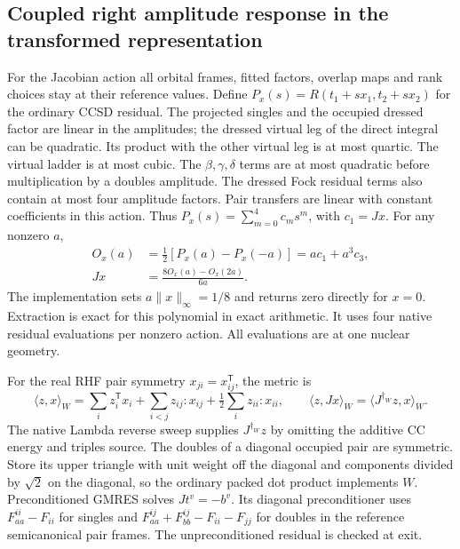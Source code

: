 \documentclass[11pt]{article}
\begin{document}
\subsection{Coupled right amplitude response in the transformed representation}
For the Jacobian action all orbital frames, fitted factors, overlap maps and
rank choices stay at their reference values. Define
$P_x(s)=R(t_1+s x_1,t_2+s x_2)$ for the ordinary CCSD residual.
The projected singles and the occupied dressed factor are linear in the
amplitudes; the dressed virtual leg of the direct integral can be quadratic.
Its product with the other virtual leg is at most quartic. The virtual
ladder is at most cubic. The $\beta,\gamma,\delta$ terms are at most quadratic
before multiplication by a doubles amplitude. The dressed Fock residual
terms also contain at most four amplitude factors. Pair transfers are linear
with constant coefficients in this action. Thus
$P_x(s)=\sum_{m=0}^4 c_m s^m$, with $c_1=Jx$. For any nonzero $a$,
\begin{align}
 O_x(a)&=\tfrac12[P_x(a)-P_x(-a)]=a c_1+a^3 c_3,\\
 Jx&=\frac{8O_x(a)-O_x(2a)}{6a}.
\end{align}
The implementation sets $a\|x\|_\infty=1/8$ and returns zero directly for
$x=0$. Extraction is exact for this polynomial in exact arithmetic.
It uses four native residual evaluations per nonzero action. All evaluations
are at one nuclear geometry.

For the real RHF pair symmetry $x_{ji}=x_{ij}^{\mathsf T}$, the metric is
\begin{equation}
 \langle z,x\rangle_W=\sum_i z_i^{\mathsf T}x_i
  +\sum_{i<j}z_{ij}:x_{ij}+\tfrac12\sum_i z_{ii}:x_{ii},
 \qquad \langle z,Jx\rangle_W=\langle J^{\dagger_W}z,x\rangle_W .
\end{equation}
The native Lambda reverse sweep supplies $J^{\dagger_W}z$ by omitting the
additive CC energy and triples source. The doubles of a diagonal occupied
pair are symmetric. Store its upper triangle with unit weight off the
diagonal and components divided by $\sqrt{2}$ on the diagonal, so the
ordinary packed dot product implements $W$.
Preconditioned GMRES solves $Jt^v=-b^v$. Its diagonal preconditioner uses
$F_{aa}^{ii}-F_{ii}$ for singles and
$F_{aa}^{ij}+F_{bb}^{ij}-F_{ii}-F_{jj}$ for doubles in the reference
semicanonical pair frames. The unpreconditioned residual is checked at exit.
\end{document}
